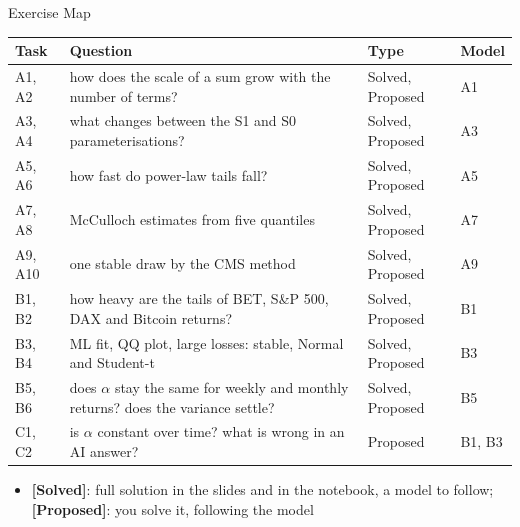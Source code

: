 \begin{frame}{Exercise Map}
\itemsize{\small}
\begin{center}
\footnotesize
\begin{tabular}{>{\raggedright\arraybackslash}p{1.1cm}>{\raggedright\arraybackslash}p{7.5cm}>{\raggedright\arraybackslash}p{1.9cm}>{\raggedright\arraybackslash}p{1.4cm}}
\toprule
\textbf{Task} & \textbf{Question} & \textbf{Type} & \textbf{Model} \\
\midrule
A1, A2 & how does the scale of a sum grow with the number of terms? & Solved, Proposed & A1 \\
A3, A4 & what changes between the S1 and S0 parameterisations? & Solved, Proposed & A3 \\
A5, A6 & how fast do power-law tails fall? & Solved, Proposed & A5 \\
A7, A8 & McCulloch estimates from five quantiles & Solved, Proposed & A7 \\
A9, A10 & one stable draw by the CMS method & Solved, Proposed & A9 \\
B1, B2 & how heavy are the tails of BET, S\&P 500, DAX and Bitcoin returns? & Solved, Proposed & B1 \\
B3, B4 & ML fit, QQ plot, large losses: stable, Normal and Student-t & Solved, Proposed & B3 \\
B5, B6 & does $\alpha$ stay the same for weekly and monthly returns? does the variance settle? & Solved, Proposed & B5 \\
C1, C2 & is $\alpha$ constant over time? what is wrong in an AI answer? & Proposed & B1, B3 \\
\bottomrule
\end{tabular}
\end{center}
\begin{itemize}
    \item \textbf{[Solved]}: full solution in the slides and in the notebook, a model to follow; \textbf{[Proposed]}: you solve it, following the model
\end{itemize}
\end{frame}


